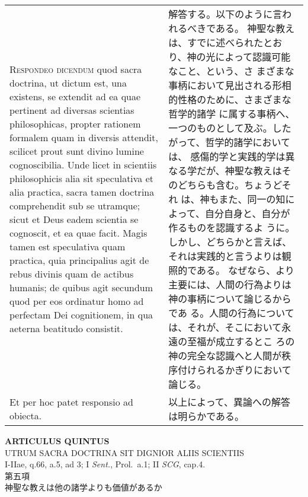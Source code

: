 \documentclass[10pt]{jsarticle} %
\begin{document}
\begin{longtable}{p{21em}p{21em}}
\\


{\scshape Respondeo dicendum} quod sacra doctrina, ut
dictum est, una existens, se extendit ad ea quae pertinent ad diversas
scientias philosophicas, propter rationem formalem quam in diversis
attendit, scilicet prout sunt divino lumine cognoscibilia. Unde licet in
scientiis philosophicis alia sit speculativa et alia practica, sacra
tamen doctrina comprehendit sub se utramque; sicut et Deus eadem
scientia se cognoscit, et ea quae facit. Magis tamen est speculativa
quam practica, quia principalius agit de rebus divinis quam de actibus
humanis; de quibus agit secundum quod per eos ordinatur homo ad
perfectam Dei cognitionem, in qua aeterna beatitudo consistit.


&

解答する。以下のように言われるべきである。
神聖な教えは、すでに述べられたとおり、神の光によって認識可能なこと、という、さ
 まざまな事柄において見出される形相的性格のために、さまざまな哲学的諸学
 に属する事柄へ、一つのものとして及ぶ。したがって、哲学的諸学においては、
 感傷的学と実践的学は異なる学だが、神聖な教えはそのどちらも含む。ちょうどそれ
 は、神もまた、同一の知によって、自分自身と、自分が作るものを認識するよ
 うに。しかし、どちらかと言えば、それは実践的と言うよりは観照的である。
 なぜなら、より主要には、人間の行為よりは神の事柄について論じるからであ
 る。人間の行為については、それが、そこにおいて永遠の至福が成立するとこ
 ろの神の完全な認識へと人間が秩序付けられるかぎりにおいて論じる。


\\


Et per hoc patet responsio ad obiecta.


&

以上によって、異論への解答は明らかである。


\end{longtable}
\newpage


\begin{center}
 {\Large {\bf ARTICULUS QUINTUS}}\\
 {\large UTRUM SACRA DOCTRINA SIT DIGNIOR ALIIS SCIENTIIS}\\
 {\footnotesize I-IIae, q.66, a.5, ad 3; I {\itshape Sent.}, Prol.~a.1;
 II {\itshape SCG}, cap.4.}\\
 {\Large 第五項\\神聖な教えは他の諸学よりも価値があるか}
\end{center}
\end{document}
